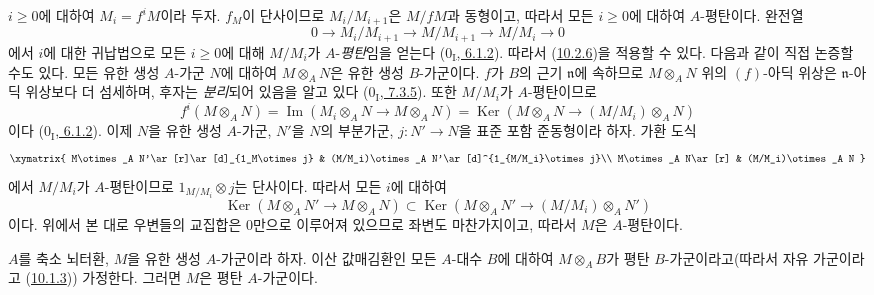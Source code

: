 $i\geq0$에 대하여 $M_i=f^iM$이라 두자. $f_M$이 단사이므로
$M_i/M_{i+1}$은 $M/fM$과 동형이고, 따라서 모든 $i\geq0$에 대하여
$A$-평탄이다. 완전열
\[
  0\longrightarrow M_i/M_{i+1}\longrightarrow M/M_{i+1}
  \longrightarrow M/M_i\longrightarrow0
\]
에서 $i$에 대한 귀납법으로 모든 $i\geq0$에 대해 $M/M_i$가
$A$-\emph{평탄}임을 얻는다
(\hyperref[0.6.1.2-ko]{$0_{\mathrm I}$, 6.1.2}). 따라서
(\hyperref[0.10.2.6-fr]{10.2.6})을 적용할 수 있다. 다음과 같이 직접
논증할 수도 있다. 모든 유한 생성 $A$-가군 $N$에 대하여
$M\otimes_A N$은 유한 생성 $B$-가군이다. $f$가 $B$의 근기
$\mathfrak n$에 속하므로 $M\otimes_A N$ 위의 $(f)$-아딕 위상은
$\mathfrak n$-아딕 위상보다 더 섬세하며, 후자는 \emph{분리}되어 있음을
알고 있다 (\hyperref[0.7.3.5-ko]{$0_{\mathrm I}$, 7.3.5}). 또한
$M/M_i$가 $A$-평탄이므로
\[
  f^i(M\otimes_A N)=\operatorname{Im}(M_i\otimes_A N\to M\otimes_A N)
  =\operatorname{Ker}(M\otimes_A N\to(M/M_i)\otimes_A N)
\]
이다 (\hyperref[0.6.1.2-ko]{$0_{\mathrm I}$, 6.1.2}). 이제 $N$을 유한
생성 $A$-가군, $N'$을 $N$의 부분가군, $j:N'\to N$을 표준 포함
준동형이라 하자. 가환 도식
\[
\xymatrix{
  M\otimes_A N'\ar[r]\ar[d]_{1_M\otimes j} &
  (M/M_i)\otimes_A N'\ar[d]^{1_{M/M_i}\otimes j}\\
  M\otimes_A N\ar[r] & (M/M_i)\otimes_A N
}
\]
에서 $M/M_i$가 $A$-평탄이므로 $1_{M/M_i}\otimes j$는 단사이다.
따라서 모든 $i$에 대하여
\[
  \operatorname{Ker}(M\otimes_A N'\to M\otimes_A N)
  \subset\operatorname{Ker}(M\otimes_A N'\to(M/M_i)\otimes_A N')
\]
이다. 위에서 본 대로 우변들의 교집합은 $0$만으로 이루어져 있으므로
좌변도 마찬가지이고, 따라서 $M$은 $A$-평탄이다.

\begin{proposition}[10.2.8]
\label{0.10.2.8-fr}
$A$를 축소 뇌터환, $M$을 유한 생성 $A$-가군이라 하자. 이산
값매김환인 모든 $A$-대수 $B$에 대하여 $M\otimes_A B$가 평탄
$B$-가군이라고(따라서 자유 가군이라고
(\hyperref[0.10.1.3-fr]{10.1.3})) 가정한다. 그러면 $M$은 평탄
$A$-가군이다.
\end{proposition}

